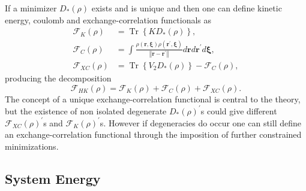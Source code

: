 \documentclass[aps,preprint]{revtex4}%
\begin{document}
If a minimizer $D_{\ast}\left(  \rho\right)  $ exists and is unique and then
one can define kinetic energy, coulomb and exchange-correlation functionals
as
\begin{align}
\mathcal{F}_{K}\left(  \rho\right)   &  =\operatorname{Tr}\left\{  KD_{\ast
}\left(  \rho\right)  \right\}  ,\nonumber\\
\mathcal{F}_{C}\left(  \rho\right)   &  =\int\frac{\rho\left(
\boldsymbol{r,\xi}\right)  \rho\left(  \boldsymbol{r}^{\prime}\boldsymbol{,\xi
}\right)  }{\left\Vert \boldsymbol{r-r}^{\prime}\right\Vert }d\boldsymbol{r}%
d\boldsymbol{r}^{\prime}d\boldsymbol{\xi},\nonumber\\
\mathcal{F}_{XC}\left(  \rho\right)   &  =\operatorname{Tr}\left\{
V_{2}D_{\ast}\left(  \rho\right)  \right\}  -\mathcal{F}_{C}\left(
\rho\right)  ,
\end{align}
producing the decomposition
\begin{equation}
\mathcal{F}_{HK}\left(  \rho\right)  =\mathcal{F}_{K}\left(  \rho\right)
+\mathcal{F}_{C}\left(  \rho\right)  +\mathcal{F}_{XC}\left(  \rho\right)  .
\end{equation}
The concept of a unique exchange-correlation functional is central to the
theory, but the existence of non isolated degenerate $D_{\ast}\left(
\rho\right)  ^{\prime}$s could give different $\mathcal{F}_{XC}\left(
\rho\right)  ^{\prime}$s and $\mathcal{F}_{K}\left(  \rho\right)  ^{\prime}$s.
However if degeneracies do occur one can still define an exchange-correlation
functional through the imposition of further constrained minimizations.

\subsection{System Energy\label{MolSysEn}}
\end{document}

